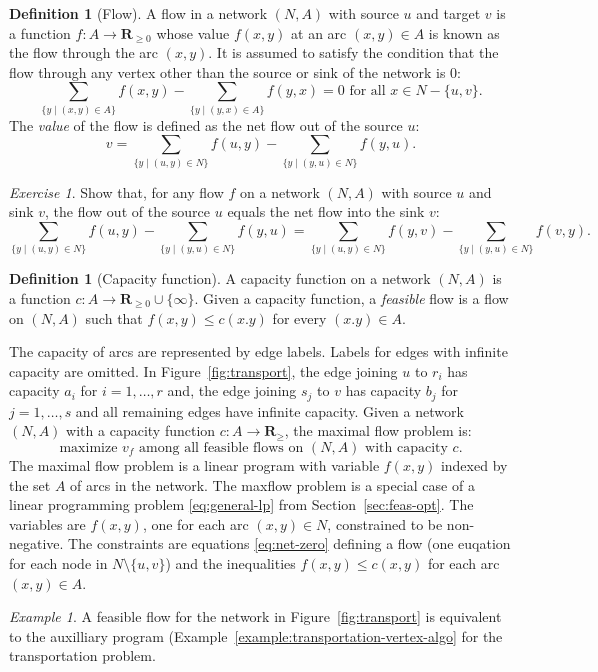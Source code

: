 \documentclass{amsbook}
\newcommand{\RR}{\mathbf R}
\theoremstyle{definition}
\newtheorem{definition}[theorem]{Definition}
\theoremstyle{remark}
\newtheorem{example}[theorem]{Example}
\newtheorem{exercise}[theorem]{Exercise}
\begin{document}
\begin{definition}
  [Flow]
  A flow in a network $(N,A)$ with source $u$ and target $v$ is a function $f:A\to \RR_{\geq 0}$ whose value $f(x,y)$ at an arc $(x,y)\in A$ is known as the flow through the arc $(x,y)$.
  It is assumed to satisfy the condition that the flow through any vertex other than the source or sink of the network is $0$:
  \begin{equation}
    \label{eq:net-zero}
    \tag{*}
    \sum_{\{y\mid (x,y)\in A\}}f(x,y) - \sum_{\{y\mid (y,x)\in A\}} f(y,x) = 0 \text{ for all } x\in N-\{u,v\}.
  \end{equation}
  The \emph{value} of the flow is defined as the net flow out of the source $u$:
  \begin{displaymath}
    v = \sum_{\{y\mid (u,y)\in N\}} f(u,y) - \sum_{\{y\mid (y,u)\in N\}} f(y,u).
  \end{displaymath}
\end{definition}
\begin{exercise}
  Show that, for any flow $f$ on a network $(N,A)$ with source $u$ and sink $v$, the flow out of the source $u$ equals the net flow into the sink $v$:
  \begin{displaymath}
    \sum_{\{y\mid (u,y)\in N\}} f(u,y) - \sum_{\{y\mid (y,u)\in N\}} f(y,u) = \sum_{\{y\mid (u,y)\in N\}} f(y,v) - \sum_{\{y\mid (y,u)\in N\}} f(v,y).
  \end{displaymath}
\end{exercise}
\begin{definition}
  [Capacity function]
  A capacity function on a network $(N,A)$ is a function $c:A\to \RR_{\geq 0}\cup\{\infty\}$.
  Given a capacity function, a \emph{feasible} flow is a flow on $(N,A)$ such that $f(x,y)\leq c(x.y)$ for every $(x.y)\in A$.
\end{definition}
The capacity of arcs are represented by edge labels.
Labels for edges with infinite capacity are omitted.
In Figure~\ref{fig:transport}, the edge joining $u$ to $r_i$ has capacity $a_i$ for $i=1,\dotsc,r$ and, the edge joining $s_j$ to $v$ has capacity $b_j$ for $j=1,\dotsc,s$ and all remaining edges have infinite capacity.
Given a network $(N,A)$ with a capacity function $c:A\to \RR_{\geq}$, the maximal flow problem is:
\begin{equation}
  \label{eq:flowmax}
  \tag{F}
  \text{maximize $v_f$ among all feasible flows on $(N,A)$ with capacity $c$.}
\end{equation}
The maximal flow problem is a linear program with variable $f(x,y)$ indexed by the set $A$ of arcs in the network.
The maxflow problem is a special case of a linear programming problem \eqref{eq:general-lp} from Section~\ref{sec:feas-opt}.
The variables are $f(x,y)$, one for each arc $(x,y)\in N$, constrained to be non-negative.
The constraints are equations \eqref{eq:net-zero} defining a flow (one euqation for each node in $N\setminus \{u,v\}$) and the inequalities $f(x,y)\leq c(x,y)$ for each arc $(x,y)\in A$. 
\begin{example}
  A feasible flow for the network in Figure~\ref{fig:transport} is equivalent to the auxilliary program (Example~\ref{example:transportation-vertex-algo} for the transportation problem.
\end{example}



\end{document}
